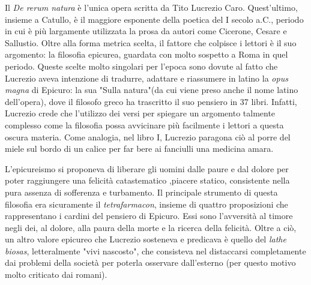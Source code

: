 \documentclass[10pt,a4paper]{article}
\begin{document}
	Il \textit{De rerum natura} è l'unica opera scritta da Tito Lucrezio Caro. Quest'ultimo, insieme a Catullo, è il maggiore esponente della poetica del I secolo a.C., periodo in cui è più largamente utilizzata la prosa da autori come Cicerone, Cesare e Sallustio. Oltre alla forma metrica scelta, il fattore che colpisce i lettori è il suo argomento: la filosofia epicurea, guardata con molto sospetto a Roma in quel periodo. Queste scelte molto singolari per l'epoca sono dovute al fatto che Lucrezio aveva intenzione di tradurre, adattare e riassumere in latino la \textit{opus magna} di Epicuro: la sua "Sulla natura"(da cui viene preso anche il nome latino dell'opera), dove il filosofo greco ha trascritto il suo pensiero in 37 libri. Infatti, Lucrezio crede che l'utilizzo dei versi per spiegare un argomento talmente complesso come la filosofia possa avvicinare più facilmente i lettori a questa oscura materia. Come analogia, nel libro I, Lucrezio paragona ciò al porre del miele sul bordo di un calice per far bere ai fanciulli una medicina amara.
	
	L'epicureismo si proponeva di liberare gli uomini dalle paure e dal dolore per poter raggiungere una felicità catastematico ,piacere statico, consistente nella pura assenza di sofferenza e turbamento. 
	Il principale strumento di questa filosofia era sicuramente il \textit{tetrafarmacon}, insieme di quattro proposizioni che rappresentano i cardini del pensiero di Epicuro. Essi sono l'avversità al timore negli dei, al dolore, alla paura della morte e la ricerca della felicità.
	Oltre a ciò, un altro valore epicureo che Lucrezio sosteneva e predicava è quello del \textit{lathe biosas}, letteralmente "vivi nascosto", che consisteva nel distaccarsi completamente dai problemi della società per poterla osservare dall'esterno (per questo motivo molto criticato dai romani).
	
	
\end{document}
